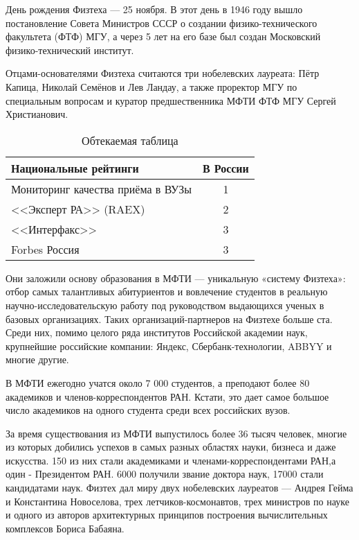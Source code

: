\documentclass[a4paper,14pt]{extarticle}
\begin{document}
День рождения Физтеха —  25 ноября. В этот день в 1946 году вышло постановление Совета Министров СССР о создании физико-технического факультета (ФТФ) МГУ, а через 5 лет на его базе был создан Московский физико-технический институт.



Отцами-основателями Физтеха считаются три нобелевских лауреата: Пётр Капица, Николай Семёнов и Лев Ландау, а также проректор МГУ по специальным вопросам и куратор предшественника МФТИ ФТФ МГУ Сергей Христианович.

\renewcommand{\arraystretch}{1.2}
\begin{wraptable}[10]{r}{0.5\linewidth}
	\vspace{-0.6cm}
	\begin{tabular}{|m{4.5cm}|c|}
		\hline
		Национальные рейтинги & В России \\ \hline
		Мониторинг качества приёма в ВУЗы & 1 \\ \hline
		<<Эксперт РА>> (RAEX) & 2 \\ \hline
		<<Интерфакс>> & 3 \\ \hline
		Forbes Россия & 3 \\ \hline
	\end{tabular}
	\caption{Обтекаемая таблица}
\end{wraptable}Они заложили основу образования в МФТИ — уникальную «систему Физтеха»: отбор самых талантливых абитуриентов и вовлечение студентов в реальную научно-исследовательскую работу под руководством выдающихся ученых в базовых организациях. Таких ор\-га\-низаций-партнеров на Физтехе больше ста. Среди них, помимо целого ряда институтов Российской академии наук, крупнейшие российские компании: Яндекс, Сбербанк-технологии, ABBYY и многие другие.



В МФТИ ежегодно учатся около 7 000 студентов, а преподают более 80 академиков и членов-корреспондентов РАН. Кстати, это дает самое большое число академиков на одного студента среди всех российских вузов.




За время существования из МФТИ выпустилось более 36 тысяч человек, многие из которых добились успехов в самых разных областях науки, бизнеса и даже искусства. 150 из них стали академиками и членами-корреспондентами РАН,а один - Президентом РАН. 6000 получили звание  доктора наук, 17000 стали кандидатами наук. Физтех дал миру двух нобелевских лауреатов —  Андрея Гейма и Константина Новоселова, трех летчиков-космонавтов, трех министров по науке и одного из авторов архитектурных принципов построения вычислительных комплексов Бориса Бабаяна.
\end{document}
